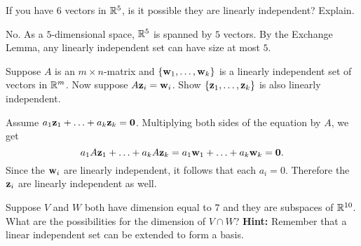 \begin{ex}
  If you have $6$ vectors in $\mathbb{R}^{5}$, is it possible they are
  linearly independent? Explain.
  \begin{sol}
    No. As a $5$-dimensional space, $\mathbb{R}^5$ is spanned by $5$
    vectors. By the Exchange Lemma, any linearly independent set can
    have size at most $5$.
  \end{sol}
\end{ex}

\begin{ex}
  Suppose $A$ is an $m\times n$-matrix and
  $\left\{\mbox{\bf w} _{1},\ldots,\mbox{\bf w}_{k}\right\}$ is a linearly independent
  set of vectors in $\mathbb{R}^{m}$. Now suppose
  $A\mbox{\bf z}_{i}=\mbox{\bf w}_{i}$. Show
  $\left\{ \mbox{\bf z}_{1},\ldots,\mbox{\bf z}_{k}\right\}$ is also linearly
  independent.
  \begin{sol}
    Assume
    $a_{1}\mbox{\bf z}_{1}+\ldots+a_{k}\mbox{\bf z}_{k}=\mbox{\bf 0}$. Multiplying
    both sides of the equation by $A$, we get
    \begin{equation*}
      a_{1}A\mbox{\bf z}_{1}+\ldots+a_{k}A\mbox{\bf z}_{k}=
      a_{1}\mbox{\bf w}_{1}+\ldots+a_{k}\mbox{\bf w}_{k}=\mbox{\bf 0}.
    \end{equation*}
    Since the $\mbox{\bf w}_{i}$ are linearly independent, it follows that
    each $a_{i}=0$. Therefore the $\mbox{\bf z}_{i}$ are linearly
    independent as well.
  \end{sol}
\end{ex}

\begin{ex}
  Suppose $V$ and $W$ both have dimension equal to $7$ and they are
  subspaces of $\mathbb{R}^{10}$. What are the possibilities for the dimension
  of $V\cap W$? \textbf{Hint:} Remember that a linear independent set can be
  extended to form a basis.
\end{ex}

